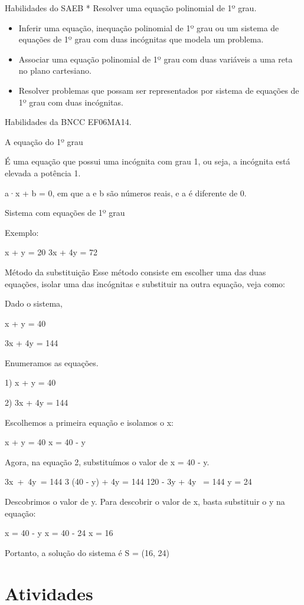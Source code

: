 Habilidades do SAEB * Resolver uma equação polinomial de 1º grau.

\begin{itemize}
\item
  Inferir uma equação, inequação polinomial de 1º grau ou um sistema de
  equações de 1º grau com duas incógnitas que modela um problema.
\item
  Associar uma equação polinomial de 1º grau com duas variáveis a uma
  reta no plano cartesiano.
\item
  Resolver problemas que possam ser representados por sistema de
  equações de 1º grau com duas incógnitas.
\end{itemize}

Habilidades da BNCC EF06MA14.

A equação do 1º grau~

É uma equação que possui uma incógnita com grau 1, ou seja, a incógnita
está elevada a potência 1.

a·x + b = 0, em que a e b são números reais, e a é diferente de 0.

Sistema com equações de 1º grau

Exemplo:

x + y = 20 3x + 4y = 72

Método da substituição Esse método consiste em escolher uma das duas
equações, isolar uma das incógnitas e substituir na outra equação, veja
como:

Dado o sistema,

x + y = 40

3x + 4y = 144

Enumeramos as equações.

1) x + y = 40

2) 3x + 4y = 144

Escolhemos a primeira equação e isolamos o x:

x + y = 40 x = 40 - y

Agora, na equação 2, substituímos o valor de x = 40 - y.

3x~+~4y~= 144 3 (40 - y) + 4y = 144 120 - 3y + 4y~ = 144 y = 24

Descobrimos o valor de y. Para descobrir o valor de x, basta substituir
o y na equação:

x = 40 - y x = 40 - 24 x = 16

Portanto, a solução do sistema é S = (16, 24)

\section{Atividades}

